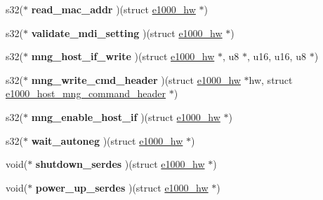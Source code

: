 \begin{DoxyCompactItemize}
\item 
\hypertarget{structe1000__mac__operations_a8301c3061c24283dca95ae998ba075d2}{
s32($\ast$ {\bfseries read\_\-mac\_\-addr} )(struct \hyperlink{structe1000__hw}{e1000\_\-hw} $\ast$)}
\label{structe1000__mac__operations_a8301c3061c24283dca95ae998ba075d2}

\item 
\hypertarget{structe1000__mac__operations_a50878828c028775d30f6a7fc0fb3b574}{
s32($\ast$ {\bfseries validate\_\-mdi\_\-setting} )(struct \hyperlink{structe1000__hw}{e1000\_\-hw} $\ast$)}
\label{structe1000__mac__operations_a50878828c028775d30f6a7fc0fb3b574}

\item 
\hypertarget{structe1000__mac__operations_a065dd7843a51dcbb9c55acf3cab2e724}{
s32($\ast$ {\bfseries mng\_\-host\_\-if\_\-write} )(struct \hyperlink{structe1000__hw}{e1000\_\-hw} $\ast$, u8 $\ast$, u16, u16, u8 $\ast$)}
\label{structe1000__mac__operations_a065dd7843a51dcbb9c55acf3cab2e724}

\item 
\hypertarget{structe1000__mac__operations_af38bff484000f5107a3ee605d955cc42}{
s32($\ast$ {\bfseries mng\_\-write\_\-cmd\_\-header} )(struct \hyperlink{structe1000__hw}{e1000\_\-hw} $\ast$hw, struct \hyperlink{structe1000__host__mng__command__header}{e1000\_\-host\_\-mng\_\-command\_\-header} $\ast$)}
\label{structe1000__mac__operations_af38bff484000f5107a3ee605d955cc42}

\item 
\hypertarget{structe1000__mac__operations_a83c118bfc8f48f9e0f973838c4903ac6}{
s32($\ast$ {\bfseries mng\_\-enable\_\-host\_\-if} )(struct \hyperlink{structe1000__hw}{e1000\_\-hw} $\ast$)}
\label{structe1000__mac__operations_a83c118bfc8f48f9e0f973838c4903ac6}

\item 
\hypertarget{structe1000__mac__operations_a6396e1d95fe20797b8ce2a2f072093ee}{
s32($\ast$ {\bfseries wait\_\-autoneg} )(struct \hyperlink{structe1000__hw}{e1000\_\-hw} $\ast$)}
\label{structe1000__mac__operations_a6396e1d95fe20797b8ce2a2f072093ee}

\item 
\hypertarget{structe1000__mac__operations_a9df85251f927ea9409981d95b5c2a9e0}{
void($\ast$ {\bfseries shutdown\_\-serdes} )(struct \hyperlink{structe1000__hw}{e1000\_\-hw} $\ast$)}
\label{structe1000__mac__operations_a9df85251f927ea9409981d95b5c2a9e0}

\item 
\hypertarget{structe1000__mac__operations_aab717f4bdbb047474162847c1d895bfa}{
void($\ast$ {\bfseries power\_\-up\_\-serdes} )(struct \hyperlink{structe1000__hw}{e1000\_\-hw} $\ast$)}
\label{structe1000__mac__operations_aab717f4bdbb047474162847c1d895bfa}

\end{DoxyCompactItemize}


